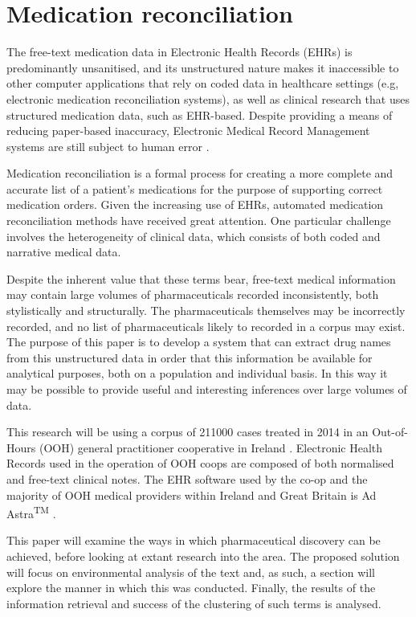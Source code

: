 
\chapter{Medication reconciliation}

The free-text medication data in Electronic Health Records (EHRs) is predominantly unsanitised, and its unstructured nature makes it inaccessible to other computer applications that rely on coded data in healthcare settings (e.g, electronic medication reconciliation systems), as well as clinical research that uses structured medication data, such as EHR-based\cite{kushima2012text}. Despite providing a means of reducing paper-based inaccuracy, Electronic Medical Record Management systems are still subject to human error \cite{koppel2009emr}.

Medication reconciliation is a formal process for creating a more complete and accurate list of a patient's medications for the purpose of supporting correct medication orders. Given the increasing use of EHRs, automated medication reconciliation methods have received great attention\cite{grossman2014hospital}. One particular challenge involves the heterogeneity of clinical data, which consists of both coded and narrative medical data.\cite{michaelsen2015medication}

Despite the inherent value that these terms bear, free-text medical information may contain large volumes of pharmaceuticals recorded inconsistently, both stylistically and structurally. The pharmaceuticals themselves may be incorrectly recorded, and no list of pharmaceuticals likely to recorded in a corpus may exist. The purpose of this paper is to develop a system that can extract drug names from this unstructured data in order that this information be available for analytical purposes, both on a population and individual basis. In this way it may be possible to provide useful and interesting inferences over large volumes of data.

This research will be using a corpus of 211000 cases treated in 2014 in an Out-of-Hours (OOH) general practitioner cooperative in Ireland \cite{natreview}. Electronic Health Records used in the operation of OOH coops are composed of both normalised and free-text clinical notes. The EHR software used by the co-op and the majority of OOH medical providers within Ireland and Great Britain is Ad Astra\textsuperscript{TM} \cite{natreview}.  

This paper will examine the ways in which pharmaceutical discovery can be achieved, before looking at extant research into the area. The proposed solution will focus on environmental analysis of the text and, as such, a section will explore the manner in which this was conducted. Finally, the results of the information retrieval and success of the clustering of such terms is analysed.   



